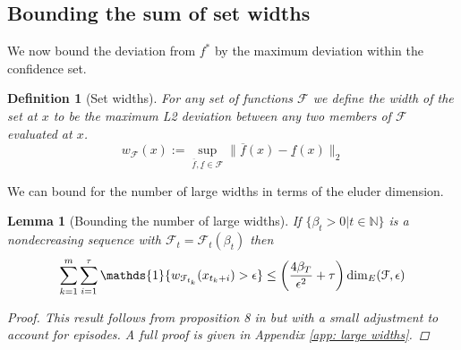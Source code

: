 \documentclass{article}
\newtheorem{lemma}{Lemma}
\newtheorem{mydef}{Definition}
\newcommand{\Nat}{\mathbb{N}}
\newcommand{\Ind}{\mathds{1}}
\newcommand{\Fc}{\mathcal{F}}
\begin{document}
\subsection{Bounding the sum of set widths}
We now bound the deviation from $f^*$ by the maximum deviation within the confidence set.

\begin{mydef}[Set widths]
\hspace{0.00000000000001mm} \newline
For any set of functions $\Fc$ we define the width of the set at $x$ to be the maximum L2 deviation between any two members of $\Fc$ evaluated at $x$.
$$ w_\Fc(x) := \sup_{\overline{f},\underline{f} \in \Fc} \| \overline{f}(x) - \underline{f}(x)\|_2$$
\end{mydef}

We can bound for the number of large widths in terms of the eluder dimension.

\begin{lemma}[Bounding the number of large widths]
\hspace{0.00000000000001mm} \newline
\label{lem: big widths}
If $\{ \beta_t >0 \big| t \in \Nat \}$ is a nondecreasing sequence with $\Fc_t = \Fc_t(\beta_t)$ then
$$ \sum_{k=1}^m \sum_{i=1}^\tau \Ind \{w_{\Fc_{t_k}}(x_{t_k+i}) > \epsilon \} \le
	\left( \frac{4\beta_T}{\epsilon^2}+ \tau \right) {\rm dim}_E(\Fc,\epsilon) $$

\begin{proof}
This result follows from proposition 8 in \cite{russo2013} but with a small adjustment to account for episodes. A full proof is given in Appendix \ref{app: large widths}.
\end{proof}
\end{lemma}
\end{document}
